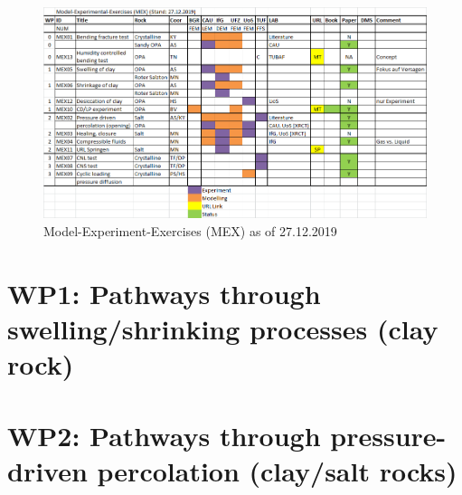 \clearpage
\begin{figure}[hbtp]
\caption{Model-Experiment-Exercises (MEX) as of 27.12.2019}
\centering
\includegraphics[width=18cm,angle=90]{figures/mex-overview.png}
\end{figure}

\clearpage

\clearpage

\clearpage

\clearpage
\section*{WP1: Pathways through swelling/shrinking processes (clay rock)}

\clearpage
\clearpage

\clearpage
\clearpage

\clearpage

\clearpage
\clearpage
\section*{WP2: Pathways through pressure-driven percolation (clay/salt rocks)}

\clearpage

\clearpage

\clearpage

\clearpage

\clearpage
